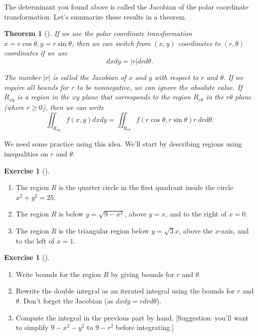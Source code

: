 \documentclass[10pt,]{book}
\theoremstyle{plain}
\newtheorem{theorem}{Theorem}[section]
\theoremstyle{definition}
\theoremstyle{definition}
\theoremstyle{definition}
\theoremstyle{definition}
\newtheorem{exploration}[project]{Exercise}
\theoremstyle{definition}
\numberwithin{equation}{section}
\begin{document}
The determinant you found above is called the Jacobian of the polar coordinate transformation. Let's summarize these results in a theorem.%
\begin{theorem}[{}]\label{theorem-10}
If we use the polar coordinate transformation \(x=r\cos\theta, y=r\sin\theta\), then we can switch from \((x,y)\) coordinates to \((r,\theta)\) coordinates if we use%
\begin{equation*}
dxdy=|r|drd\theta.
\end{equation*}
%
\par
The number \(|r|\) is called the Jacobian of \(x\) and \(y\) with respect to \(r\) and \(\theta\). If we require all bounds for \(r\) to be nonnegative, we can ignore the absolute value. If \(R_{xy}\) is a region in the \(xy\) plane that corresponds to the region \(R_{r\theta}\) in the \(r\theta\) plane (where \(r\geq 0\)), then we can write%
\begin{equation*}
\iint_{R_{xy}} f(x,y) dxdy = \iint_{R_{r\theta}} f(r\cos\theta,r\sin\theta) r\ drd\theta.
\end{equation*}
%
\end{theorem}
We need some practice using this idea. We'll start by describing regions using inequalities on \(r\) and \(\theta\).%
\begin{exploration}[]\label{exploration-264}
\leavevmode%
\begin{enumerate}[font=\bfseries,label=(\alph*),ref=\alph*]
\item\label{task-716} The region \(R\) is the quarter circle in the first quadrant inside the circle \(x^2+y^2=25\).%
\item\label{task-717} The region \(R\) is below \(y=\sqrt{9-x^2}\), above \(y=x\), and to the right of \(x=0\).%
\item\label{task-718} The region \(R\) is the triangular region below \(y=\sqrt 3 x\), above the \(x\)-axis, and to the left of \(x=1\).%
\end{enumerate}
\end{exploration}
\begin{exploration}[]\label{exploration-265}
\leavevmode%
\begin{enumerate}[font=\bfseries,label=(\alph*),ref=\alph*]
\item\label{task-719} Write bounds for the region \(R\) by giving bounds for \(r\) and \(\theta\).%
\item\label{task-720} Rewrite the double integral as an iterated integral using the bounds for \(r\) and \(\theta\). Don't forget the Jacobian (as \(dxdy=rdrd\theta\)).%
\item\label{task-721} Compute the integral in the previous part by hand. [Suggestion: you'll want to simplify \(9-x^2-y^2\) to \(9-r^2\) before integrating.]%
\end{enumerate}
\end{exploration}
\end{document}
